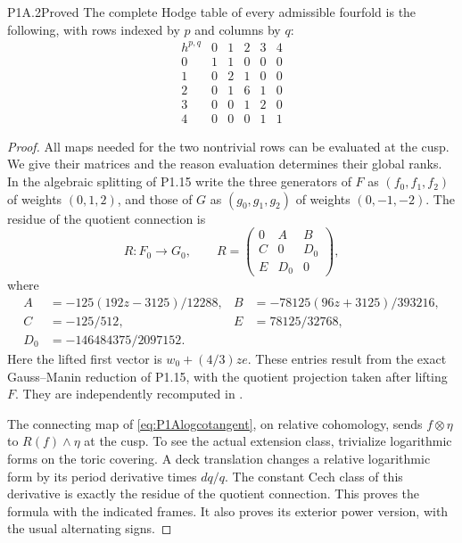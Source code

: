 \begin{statement}{P1A.2}{Proved}
The complete Hodge table of every admissible fourfold is the
following, with rows indexed by $p$ and columns by $q$:
\[
\begin{array}{c|ccccc}
h^{p,q}&0&1&2&3&4\\\hline
0&1&1&0&0&0\\
1&0&2&1&0&0\\
2&0&1&6&1&0\\
3&0&0&1&2&0\\
4&0&0&0&1&1
\end{array}
\]
\end{statement}
\begin{proof}
All maps needed for the two nontrivial rows can be evaluated at
the cusp. We give their matrices and the reason evaluation
determines their global ranks. In the algebraic splitting of
P1.15 write the three generators of $F$ as $(f_0,f_1,f_2)$ of
weights $(0,1,2)$, and those of $G$ as $(g_0,g_1,g_2)$ of
weights $(0,-1,-2)$. The residue of the quotient connection is
\[
R:F_0\longrightarrow G_0,\qquad
R=\begin{pmatrix}0&A&B\\C&0&D_0\\E&D_0&0\end{pmatrix},
\]
where
\begin{align*}
A&=-125(192z-3125)/12288,&
B&=-78125(96z+3125)/393216,\\
C&=-125/512,&E&=78125/32768,\\
D_0&=-146484375/2097152.
\end{align*}
Here the lifted first vector is $w_0+(4/3)ze$.
These entries result from the exact Gauss--Manin reduction of
P1.15, with the quotient projection taken after lifting $F$.
They are independently recomputed in
.

The connecting map of \eqref{eq:P1Alogcotangent}, on relative
cohomology, sends $f\otimes\eta$ to $R(f)\wedge\eta$ at the
cusp. To see the actual extension class, trivialize logarithmic
forms on the toric covering. A deck translation changes a
relative logarithmic form by its period derivative times
$dq/q$. The constant Cech class of this derivative is exactly
the residue of the quotient connection. This proves the
formula with the indicated frames. It also proves its exterior
power version, with the usual alternating signs.


\end{proof}
